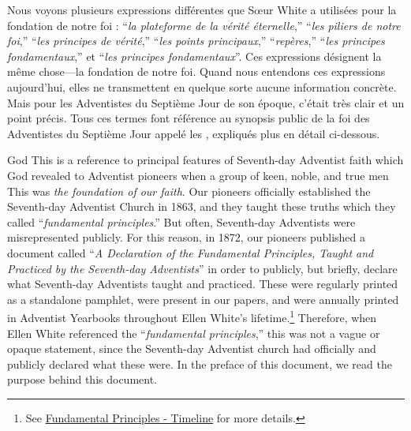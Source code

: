 Nous voyons plusieurs expressions différentes que Sœur White a utilisées pour la fondation de notre foi : “\textit{la plateforme de la vérité éternelle},” “\textit{les piliers de notre foi},” “\textit{les principes de vérité},” “\textit{les points principaux},” “\textit{repères},” “\textit{les principes fondamentaux},” et “\textit{les principes fondamentaux}”. Ces expressions désignent la même chose—la fondation de notre foi. Quand nous entendons ces expressions aujourd'hui, elles ne transmettent en quelque sorte aucune information concrète. Mais pour les Adventistes du Septième Jour de son époque, c'était très clair et un point précis. Tous ces termes font référence au synopsis public de la foi des Adventistes du Septième Jour appelé les , expliqués plus en détail ci-dessous.


God  This is a reference to principal features of Seventh-day Adventist faith which God revealed to Adventist pioneers  when a group of keen, noble, and true men  This was \textit{the foundation of our faith}. Our pioneers officially established the Seventh-day Adventist Church in 1863, and they taught these truths which they called “\textit{fundamental principles}.” But often, Seventh-day Adventists were misrepresented publicly. For this reason, in 1872, our pioneers published a document called “\textit{A Declaration of the Fundamental Principles, Taught and Practiced by the Seventh-day Adventists}” in order to publicly, but briefly, declare what  Seventh-day Adventists taught and practiced. These  were regularly printed as a standalone pamphlet, were present in our papers, and were annually printed in Adventist Yearbooks throughout Ellen White's lifetime.\footnote{See \hyperref[appendix:timeline]{Fundamental Principles - Timeline} for more details.} Therefore, when Ellen White referenced the “\textit{fundamental principles},” this was not a vague or opaque statement, since the Seventh-day Adventist church had officially and publicly declared what these  were. In the preface of this document, we read the purpose behind this document.


